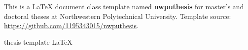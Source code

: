 
\begin{abstract}
    这是在西北工业大学硕博研究生毕业论文格式的要求下的一份 \LaTeX{} 文档类模板 \textbf{nwputhesis}，模板来源：\url{https://github.com/1195343015/nwputhesis}。
    \begin{keywords}
        学位论文 \sep 模板 \sep \LaTeX
    \end{keywords}
\end{abstract}

\begin{engabstract}
    This is a \LaTeX{} document class template named \textbf{nwputhesis} for master's and doctoral theses at Northwestern Polytechnical University. Template source: \url{https://github.com/1195343015/nwputhesis}.
    \begin{engkeywords}
        thesis \ensep template \ensep \LaTeX
    \end{engkeywords}
\end{engabstract}

